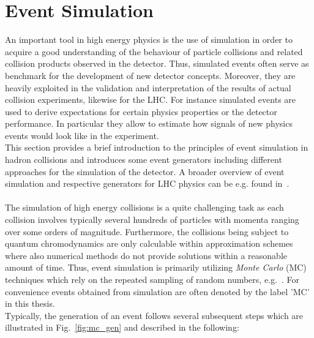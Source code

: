\section{Event Simulation}
\label{sec:simulation}
An important tool in high energy physics is the use of simulation in order to acquire a good understanding of the behaviour of particle collisions and related collision products observed in the detector. Thus, simulated events often serve as benchmark for the development of new detector concepts. Moreover, they are heavily exploited in the validation and interpretation of the results of actual collision experiments, likewise for the LHC. For instance simulated events are used to derive expectations for certain physics properties or the detector performance. In particular they allow to estimate how signals of new physics events would look like in the experiment. \\
This section provides a brief introduction to the principles of event simulation in hadron collisions and introduces some event generators including different approaches for the simulation of the detector. A broader overview of event simulation and respective generators for LHC physics can be e.g. found in~\cite{Seymour:2013ega, Buckley:2011ms}. \\
\\
The simulation of high energy collisions is a quite challenging task as each collision involves typically several hundreds of particles with momenta ranging over some orders of magnitude. Furthermore, the collisions being subject to quantum chromodynamics are only calculable within approximation schemes where also numerical methods do not provide solutions within a reasonable amount of time. Thus, event simulation is primarily utilizing \textit{Monte Carlo} (MC) techniques which rely on the repeated sampling of random numbers, \cf e.g.~\cite{bib:MCMethod}. For convenience events obtained from simulation are often denoted by the label 'MC' in this thesis. \\
Typically, the generation of an event follows several subsequent steps which are illustrated in Fig.~\ref{fig:mc_gen} and described in the following: 
